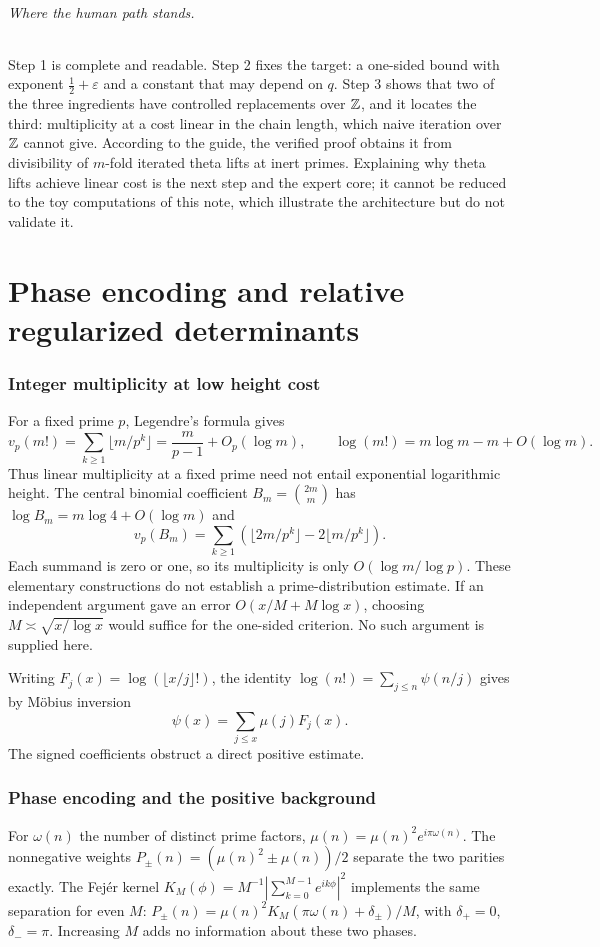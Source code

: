 \documentclass[11pt,a4paper]{article}
\theoremstyle{definition}\newtheorem{definition}[proposition]{Definition}
\theoremstyle{remark}\newtheorem{remark}[proposition]{Remark}
\begin{document}
\paragraph{Where the human path stands.} Step 1 is complete and readable. Step 2 fixes the target: a one-sided bound with exponent $\tfrac12+\varepsilon$ and a constant that may depend on $q$. Step 3 shows that two of the three ingredients have controlled replacements over $\mathbb Z$, and it locates the third: multiplicity at a cost linear in the chain length, which naive iteration over $\mathbb Z$ cannot give. According to the guide, the verified proof obtains it from divisibility of $m$-fold iterated theta lifts at inert primes. Explaining why theta lifts achieve linear cost is the next step and the expert core; it cannot be reduced to the toy computations of this note, which illustrate the architecture but do not validate it.

\part{Phase encoding and relative regularized determinants}

\section{Integer multiplicity at low height cost}
For a fixed prime $p$, Legendre's formula gives
\[
v_p(m!)=\sum_{k\ge1}\lfloor m/p^k\rfloor
=\frac{m}{p-1}+O_p(\log m),
\qquad \log(m!)=m\log m-m+O(\log m).
\]
Thus linear multiplicity at a fixed prime need not entail exponential logarithmic height. The central binomial coefficient $B_m=\binom{2m}{m}$ has $\log B_m=m\log4+O(\log m)$ and
\[
v_p(B_m)=\sum_{k\ge1}
(\lfloor2m/p^k\rfloor-2\lfloor m/p^k\rfloor).
\]
Each summand is zero or one, so its multiplicity is only $O(\log m/\log p)$. These elementary constructions do not establish a prime-distribution estimate. If an independent argument gave an error $O(x/M+M\log x)$, choosing $M\asymp\sqrt{x/\log x}$ would suffice for the one-sided criterion. No such argument is supplied here.

Writing $F_j(x)=\log(\lfloor x/j\rfloor!)$, the identity $\log(n!)=\sum_{j\le n}\psi(n/j)$ gives by M\"obius inversion
\[
\psi(x)=\sum_{j\le x}\mu(j)F_j(x).
\]
The signed coefficients obstruct a direct positive estimate.

\section{Phase encoding and the positive background}
For $\omega(n)$ the number of distinct prime factors,
$\mu(n)=\mu(n)^2 e^{i\pi\omega(n)}$. The nonnegative weights
$P_\pm(n)=(\mu(n)^2\pm\mu(n))/2$ separate the two parities exactly.
The Fej\'er kernel $K_M(\phi)=M^{-1}|\sum_{k=0}^{M-1}e^{ik\phi}|^2$ implements the same separation for even $M$:
$P_\pm(n)=\mu(n)^2 K_M(\pi\omega(n)+\delta_\pm)/M$, with $\delta_+=0$, $\delta_-=\pi$.
Increasing $M$ adds no information about these two phases.
\end{document}
